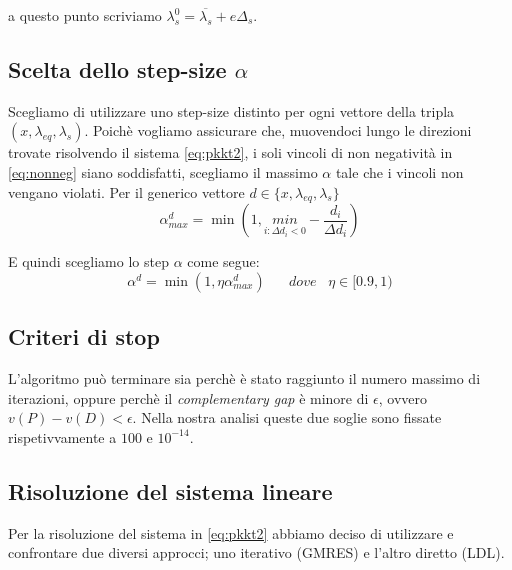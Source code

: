 a questo punto scriviamo $\lambda_s^0 = \overline{\lambda_s} + e \Delta_s$. 


\subsection{Scelta dello step-size $\alpha$}
Scegliamo di utilizzare uno step-size distinto per ogni vettore della tripla $(x, \lambda_{eq}, \lambda_s)$.
Poichè vogliamo assicurare che, muovendoci lungo le direzioni trovate risolvendo il sistema \ref{eq:pkkt2}, i soli vincoli di non negatività in \ref{eq:nonneg} siano soddisfatti, scegliamo il massimo $\alpha$ tale che i vincoli non vengano violati.
Per il generico vettore $d \in \{x,\lambda_{eq},\lambda_s\} $ 
\begin{equation}\label{eq:alpha}
    \alpha^d_{max} = \min (1, \underset{i:\Delta d_i < 0}{min}-\frac{d_i}{\Delta d_i})
\end{equation}

E quindi scegliamo lo step $\alpha$ come segue:
\begin{equation}\label{eq:alphaFinale}
\alpha^d = \min(1, \eta \alpha^d_{max}) \;\;\;\;\;\; dove\;\;\; \eta \in [0.9, 1)
\end{equation}


\subsection{Criteri di stop}\label{cap:stop}
L'algoritmo può terminare sia perchè è stato raggiunto il numero massimo di iterazioni, oppure perchè il \textit{complementary gap} è minore di $\epsilon$, ovvero $v(P)-v(D)<\epsilon$.
Nella nostra analisi queste due soglie sono fissate rispetivvamente a $100$ e $10^{-14}$.




\subsection{Risoluzione del sistema lineare}\label{cap:RISLS}
Per la risoluzione del sistema in \ref{eq:pkkt2} abbiamo deciso di utilizzare e confrontare due diversi approcci; uno iterativo (GMRES) e l'altro diretto (LDL).

